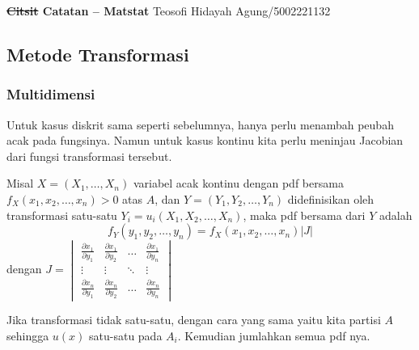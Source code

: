 \documentclass[a4paper,extrafontsizes, 9pt]{memoir}
\begin{document}
\footnotesize
	\begin{center}
		\textbf{{\st{Citsit} Catatan -- Matstat}} \hfill Teosofi Hidayah Agung/5002221132
	\end{center}
	
	\begin{multicols}{3}			
            \subsection*{\small Metode Transformasi}
                \subsubsection*{\small Multidimensi}
                    Untuk kasus diskrit sama seperti sebelumnya, hanya perlu menambah peubah acak pada fungsinya. Namun untuk kasus kontinu kita perlu meninjau Jacobian dari fungsi transformasi tersebut.

                    Misal $X=(X_1,\dots,X_n)$ variabel acak kontinu dengan pdf bersama $f_X(x_1, x_2,\dots, x_n) > 0$ atas $A$, dan $Y = (Y_1, Y_2,\dots, Y_n)$ didefinisikan
                    oleh transformasi satu-satu $Y_i = u_i(X_1,X_2,\dots ,X_n)$, maka pdf bersama dari $Y$ adalah
                    \[f_Y(y_1,y_2,\dots,y_n) = f_X(x_1,x_2,\dots,x_n)\left|J\right|\]
                    dengan $J=\begin{vmatrix}
                        \frac{\partial x_1}{\partial y_1} & \frac{\partial x_1}{\partial y_2} & \dots & \frac{\partial x_1}{\partial y_n}\\
                        \vdots & \vdots & \ddots & \vdots\\
                        \frac{\partial x_n}{\partial y_1} & \frac{\partial x_n}{\partial y_2} & \dots & \frac{\partial x_n}{\partial y_n}
                    \end{vmatrix}$ 
                
                Jika transformasi tidak satu-satu, dengan cara yang sama yaitu kita partisi $A$ sehingga $u(x)$ satu-satu pada $A_i$. Kemudian jumlahkan semua pdf nya.

\end{multicols}
\end{document}
